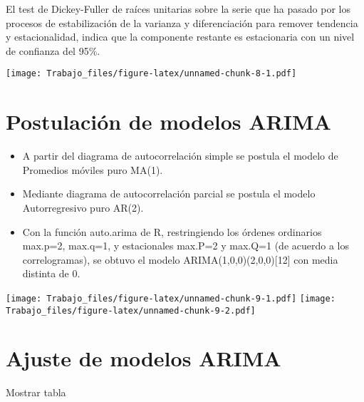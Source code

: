 \documentclass[]{article}
\providecommand{\tightlist}{%
  \setlength{\itemsep}{0pt}\setlength{\parskip}{0pt}}
\begin{document}
El test de Dickey-Fuller de raíces unitarias sobre la serie que ha
pasado por los procesos de estabilización de la varianza y
diferenciación para remover tendencia y estacionalidad, indica que la
componente restante es estacionaria con un nivel de confianza del 95\%.

\texttt{[image: Trabajo\_files/figure-latex/unnamed-chunk-8-1.pdf]}

\section{Postulación de modelos
ARIMA}\label{postulacion-de-modelos-arima}

\begin{itemize}
\tightlist
\item
  A partir del diagrama de autocorrelación simple se postula el modelo
  de Promedios móviles puro MA(1).
\item
  Mediante diagrama de autocorrelación parcial se postula el modelo
  Autorregresivo puro AR(2).
\item
  Con la función auto.arima de R, restringiendo los órdenes ordinarios
  max.p=2, max.q=1, y estacionales max.P=2 y max.Q=1 (de acuerdo a los
  correlogramas), se obtuvo el modelo ARIMA(1,0,0)(2,0,0){[}12{]} con
  media distinta de 0.
\end{itemize}

\texttt{[image: Trabajo\_files/figure-latex/unnamed-chunk-9-1.pdf]}
\texttt{[image: Trabajo\_files/figure-latex/unnamed-chunk-9-2.pdf]}

\section{Ajuste de modelos ARIMA}\label{ajuste-de-modelos-arima}

Mostrar tabla
\end{document}
